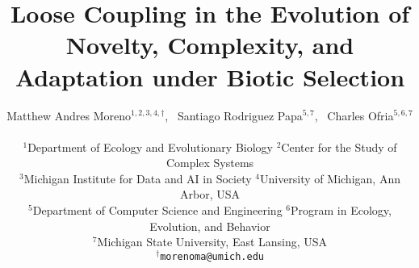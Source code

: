 
\title{
    Loose Coupling in the Evolution of Novelty, Complexity, and Adaptation under Biotic Selection
}
\author{
    Matthew Andres Moreno$^{1,2,3,4,\dagger}$,\ %
    Santiago Rodriguez Papa$^{5,7}$,\ %
    Charles Ofria$^{5,6,7}$ \\
    \mbox{}\\
    $^1$Department of Ecology and Evolutionary Biology
    $^2$Center for the Study of Complex Systems \\
    $^3$Michigan Institute for Data and AI in Society
    $^4$University of Michigan, Ann Arbor, USA \\
    $^5$Department of Computer Science and Engineering
    $^6$Program in Ecology, Evolution, and Behavior \\
    $^7$Michigan State University, East Lansing, USA \\
    $^\dagger$\texttt{morenoma@umich.edu}
}

\maketitle

%
%

